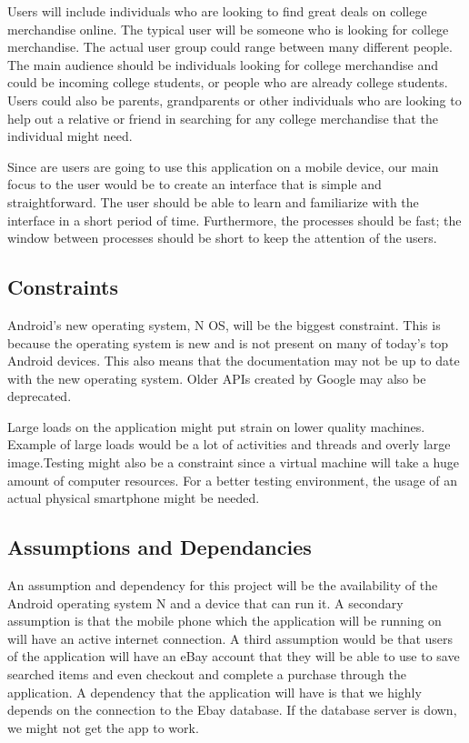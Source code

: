 \documentclass[journal,compsoc, 10pt, draftclsnofoot, onecolumn]{IEEEtran}
\begin{document}
Users will include individuals who are looking to find great deals on college 
merchandise online. The typical user will be someone who is looking for college 
merchandise. The actual user group could range between many different people. 
The main audience should be individuals looking for college merchandise and 
could be incoming college students, or people who are already college students. 
Users could also be parents, grandparents or other individuals who are looking 
to help out a relative or friend in searching for any college merchandise that 
the individual might need. \newline

Since are users are going to use this application on  a mobile device, 
our main focus to the user would be to create an interface that is simple
 and straightforward. The user should be able to learn and familiarize with the interface
 in a short period of time. Furthermore, the processes should be fast; the 
window between processes should be short to keep the attention of the users.

\subsection{Constraints}

Android's new operating system, N OS, will be the biggest constraint. This is 
because the operating system is new and is not present on many of today's top 
Android devices. This also means that the documentation may not be up to date 
with the new operating system. Older APIs created by Google may also be
 deprecated.\newline

Large loads on the application might put strain on lower quality machines. 
Example of large loads would be a lot of activities and threads and overly 
large image.Testing might also be a constraint since a virtual machine will take a huge 
amount of computer resources. For a better testing environment, the usage of an 
actual physical smartphone might be needed.

\subsection{Assumptions and Dependancies}

An assumption and dependency for this project will be the availability of the 
Android operating system N and a device that can run it. A secondary assumption 
is that the mobile phone which the application will be running on will have an 
active internet connection. A third assumption would be that users of the 
application will have an eBay account that they will be able to use to save 
searched items and even checkout and complete a purchase through the 
application. A dependency that the application will have is that we highly 
depends on the connection to the Ebay database. If the database server is down, 
we might not get the app to work.
\end{document}
